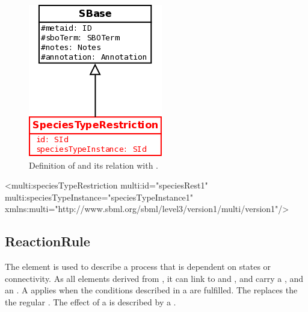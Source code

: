 \begin{figure}[H]
\begin{center}
\includegraphics[scale=0.3]{figs/pngs/SpeciesTypeRestrictionClass.png} 
\caption{Definition of  and its relation with .}
\label{fig:SpeciesTypeRestrictionClass}
\end{center}
\end{figure}

\begin{example}
<multi:speciesTypeRestriction multi:id="speciesRest1" 
                   multi:speciesTypeInstance="speciesTypeInstance1" 
                   xmlns:multi="http://www.sbml.org/sbml/level3/version1/multi/version1"/>
\end{example}

\subsection{ReactionRule}

The  element is used to describe a process that is dependent on states or connectivity. As all elements derived from , it can link to  and , and carry a , and an . A  applies when the conditions described in a  are fulfilled. The  replaces the the regular . The effect of a  is described by a . 

